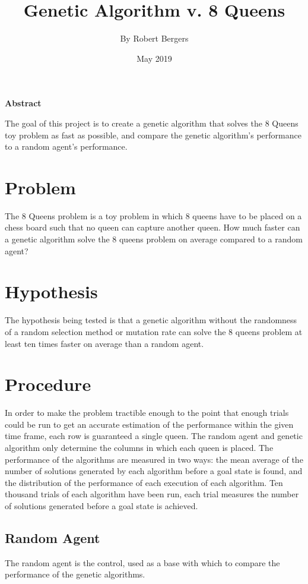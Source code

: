 \documentclass[a4paper]{article}
\title{\Large{\textbf{Genetic Algorithm v. 8 Queens}}}
\author{By Robert Bergers}
\date{May 2019}
\begin{document}
\maketitle

\begin{center}
    \Large{\textbf{Abstract}}
\end{center}
The goal of this project is to create a genetic algorithm that solves the 8 Queens toy problem as fast as possible, and compare the genetic algorithm's performance to a random agent's performance.

\section{Problem}
The 8 Queens problem is a toy problem in which 8 queens have to be placed on a chess board such that no queen can capture another queen. How much faster can a genetic algorithm solve the 8 queens problem on average compared to a random agent?

\section{Hypothesis}
The hypothesis being tested is that a genetic algorithm without the randomness of a random selection method or mutation rate can solve the 8 queens problem at least ten times faster on average than a random agent.

\section{Procedure}

In order to make the problem tractible enough to the point that enough trials could be run to get an accurate estimation of the performance within the given time frame, each row is guaranteed a single queen. The random agent and genetic algorithm only determine the columns in which each queen is placed. The performance of the algorithms are measured in two ways: the mean average of the number of solutions generated by each algorithm before a goal state is found, and the distribution of the performance of each execution of each algorithm. Ten thousand trials of each algorithm have been run, each trial measures the number of solutions generated before a goal state is achieved. \\

\subsection{Random Agent}
The random agent is the control, used as a base with which to compare the performance of the genetic algorithms.\\
\end{document}
